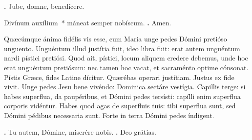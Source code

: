 \begin{small}
\textbf{\Vbar.} Jube, domne, benedícere.

Divínum auxílium~* máneat semper nobíscum. \textbf{\Rbar.} Amen.
\end{small}


Quæcúmque ánima fidélis vis esse, cum Maria unge pedes Dómini pretióso unguento. Unguéntum illud justítia fuit, ideo libra fuit: erat autem unguéntum nardi pístici pretiósi. Quod ait, pístici, locum aliquem credere debemus, unde hoc erat unguéntum pretiósum: nec tamen hoc vacat, et sacraménto optime cónsonat. Pístis Græce, fides Latine dícitur. Quærébas operari justítiam. Justus ex fide vivit. Unge pedes Jesu bene vivéndo: Dominica sectáre vestígia. Capillis terge: si habes superflua, da paupéribus, et Dómini pedes tersísti: capílli enim superflua corporis vidéntur. Habes quod agas de superfluis tuis: tibi superflua sunt, sed Dómini pédibus necessaria sunt. Forte in terra Dómini pedes índigent.

\textbf{\Vbar.} Tu autem, Dómine, miserére nobis.
\textbf{\Rbar.} Deo grátias.

